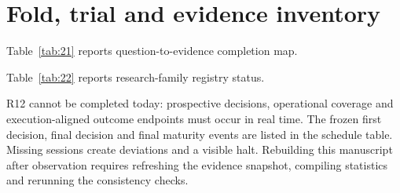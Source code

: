 \section{Fold, trial and evidence inventory}\label{sec:appendix-b}

\noindent Table~\ref{tab:21} reports question-to-evidence completion map.



\noindent Table~\ref{tab:22} reports research-family registry status.



R12 cannot be completed today: prospective decisions, operational coverage and execution-aligned outcome endpoints must occur in real time. The frozen first decision, final decision and final maturity events are listed in the schedule table. Missing sessions create deviations and a visible halt. Rebuilding this manuscript after observation requires refreshing the evidence snapshot, compiling statistics and rerunning the consistency checks.

